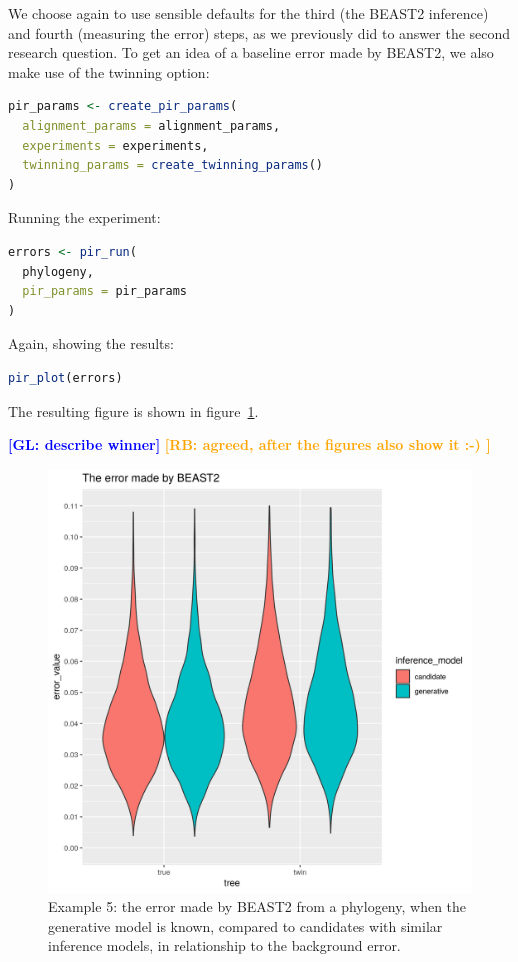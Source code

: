 \documentclass{article}
\newcommand{\giovanni}[1]{\textcolor{blue}{\textbf{[GL: #1]}}}
\newcommand{\richel}[1]{\textcolor{orange}{\textbf{[RB: #1]}}}
\begin{document}
We choose again to use sensible defaults for the third (the BEAST2 inference) and fourth (measuring the error) steps, as we previously did to answer the second research question. To get an idea of a baseline error made by BEAST2, we also make use of the twinning option:

\begin{lstlisting}[language=R, floatplacement=H, frame=single]
pir_params <- create_pir_params(
  alignment_params = alignment_params,
  experiments = experiments,
  twinning_params = create_twinning_params()
)
\end{lstlisting}

Running the experiment:

\begin{lstlisting}[language=R, floatplacement=H, frame=single]
errors <- pir_run(
  phylogeny,
  pir_params = pir_params
)
\end{lstlisting}

Again, showing the results:

\begin{lstlisting}[language=R, floatplacement=H, frame=single]
pir_plot(errors)
\end{lstlisting}

The resulting figure is shown in figure~\ref{fig:example_5}.

\giovanni{describe winner}
\richel{agreed, after the figures also show it :-) }

\begin{figure}[ht]
  \includegraphics[width=\textwidth]{example_5_errors.png}
  \caption{
    Example 5: the error made by BEAST2 from a phylogeny, 
    when the generative model is known, 
    compared to candidates with similar inference models, 
    in relationship to the background error.
  }
  \label{fig:example_5}
\end{figure}
\end{document}
